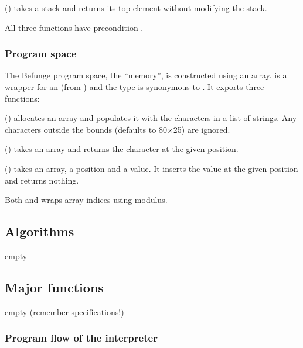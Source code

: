 \documentclass[12pt, a4paper]{article}
\begin{document}
\vspace{6pt}
\noindent
{} () takes a stack and returns its top element without modifying the stack.

\vspace{6pt}
\noindent
All three functions have precondition .

\subsubsection{Program space}
\label{sec:structmem}

The Befunge program space, the “memory”, is constructed using an array.  is a wrapper for an  (from ) and the type  is synonymous to . It exports three functions:

\vspace{6pt}
\noindent
{} () allocates an array and populates it with the characters in a list of strings. Any characters outside the bounds (defaults to 80$\times$25) are ignored.

\vspace{6pt}
\noindent
{} () takes an array and returns the character at the given position.

\vspace{6pt}
\noindent
{} () takes an array, a position and a value. It inserts the value at the given position and returns nothing.

\vspace{6pt}
\noindent
Both  and  wraps array indices using modulus.

\subsection{Algorithms}
\label{sec:algorithms}

empty

\subsection{Major functions}
\label{sec:functions}

empty (remember specifications!)

\subsubsection{Program flow of the interpreter}
\label{sec:flow}
\end{document}
